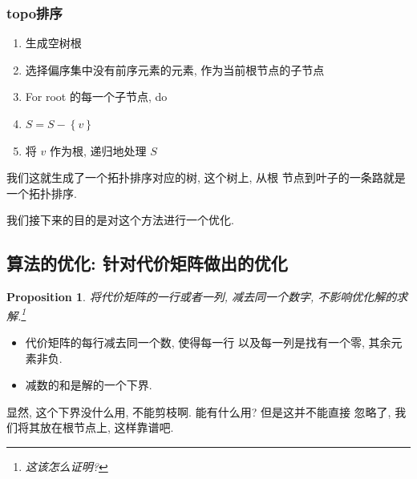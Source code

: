 \documentclass[a4paper, 10pt]{ctexart} %
\newtheorem{proposition}{Proposition}
\begin{document}
\subsubsection{topo排序}
\begin{enumerate}
    \item 
生成空树根 
\item
选择偏序集中没有前序元素的元素, 作为当前根节点的子节点
\item
For root 的每一个子节点, do 
\item
$S = S  - \left\{v\right\}$
\item 
将 $v$ 作为根, 递归地处理 $S$
\end{enumerate}
我们这就生成了一个拓扑排序对应的树, 这个树上, 从根
节点到叶子的一条路就是一个拓扑排序.

我们接下来的目的是对这个方法进行一个优化.

\subsection{算法的优化: 针对代价矩阵做出的优化}
\begin{proposition}
    将代价矩阵的一行或者一列, 减去同一个数字, 不影响优化解的求解.\footnote{这该怎么证明?}
\end{proposition}
\begin{itemize}
    \item 代价矩阵的每行减去同一个数, 使得每一行
    以及每一列是找有一个零, 其余元素非负. 
    \item 减数的和是解的一个下界. 
\end{itemize}    
显然, 这个下界没什么用, 不能剪枝啊. 能有什么用? 但是这并不能直接
忽略了, 我们将其放在根节点上, 这样靠谱吧. 
\end{document}

